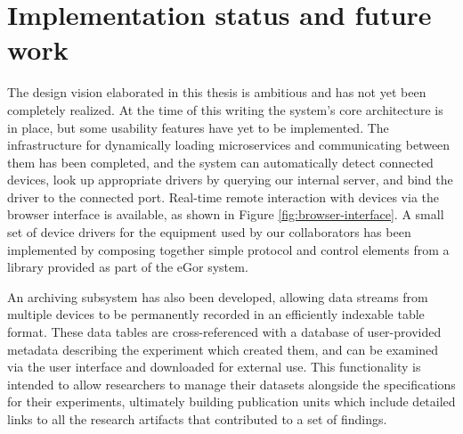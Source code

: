 \documentclass[../thesis]{subfiles}
\begin{document}
\section{Implementation status and future work}
The design vision elaborated in this thesis is ambitious and has not
yet been completely realized. At the time of this writing the system's
core architecture is in place, but some usability features have yet to
be implemented. The infrastructure for dynamically loading
microservices and communicating between them has been completed, and
the system can automatically detect connected devices, look up
appropriate drivers by querying our internal server, and bind the
driver to the connected port. Real-time remote interaction with
devices via the browser interface is available, as shown in Figure
\ref{fig:browser-interface}. A small set of device drivers for the
equipment used by our collaborators has been implemented by composing
together simple protocol and control elements from a library provided
as part of the eGor system.


An archiving subsystem has also been developed, allowing data streams
from multiple devices to be permanently recorded in an efficiently
indexable table format. These data tables are cross-referenced with a
database of user-provided metadata describing the experiment which
created them, and can be examined via the user interface and
downloaded for external use. This functionality is intended to allow
researchers to manage their datasets alongside the specifications for
their experiments, ultimately building publication units which include
detailed links to all the research artifacts that contributed to a set
of findings.
\end{document}
